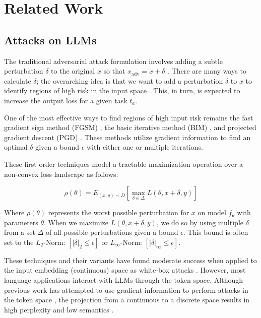 \section{Related Work}
\vspace{-0em} %
\subsection{Attacks on LLMs}
\vspace{-0em}
The traditional adversarial attack formulation involves adding a subtle perturbation $\delta$ to the original $x$ so that $ x_{\text{adv}} = x + \delta$ \citep{Adversarial_examples}. There are many ways to calculate $\delta$; the overarching idea is that we want to add a perturbation $\delta$ to $x$ to identify regions of high risk in the input space \citep{FreeLB}. This, in turn, is expected to increase the output loss for a given task $t_a$.

One of the most effective ways to find regions of high input risk remains the fast gradient sign method (FGSM) \citep{AT}, the basic iterative method (BIM) \citep{BIM}, and projected gradient descent (PGD) \citep{PGD}. These methods utilize gradient information to find an optimal $\delta$ given a bound $\epsilon$ with either one or multiple iterations.

These first-order techniques model a tractable maximization operation over a non-convex loss landscape as follows:

\vspace{-0em} %
\begin{equation}
\rho(\theta) = E_{(x,y) \sim D} \left[ \max_{\delta \in \Delta} L(\theta, x + \delta, y) \right]
\end{equation}
\vspace{-0em} %

Where $\rho(\theta)$ represents the worst possible perturbation for $x$ on model $f_{\theta}$ with parameters $\theta$. When we maximize $ L(\theta, x + \delta, y)$, we do so by using multiple $\delta$ from a set $\Delta$ of all possible perturbations given a bound $\epsilon$. This bound is often set to the $L_2$-Norm: $[ |\delta|_2 \leq \epsilon ]$ or $L_{\infty}$-Norm: $[ |\delta|_\infty \leq \epsilon ]$.

These techniques and their variants have found moderate success when applied to the input embedding (continuous) space as white-box attacks \citep{ASCC, FreeLB, Convexhull}. However, most language applications interact with LLMs through the token space. Although previous work has attempted to use gradient information to perform attacks in the token space \citep{Hotflip, LLM_Attack_1, FGPM}, the projection from a continuous to a discrete space results in high perplexity and low semantics \citep{AutoDAN_Add_New_Tokens_Algo, AutoDan_Genetic_Algo}.

